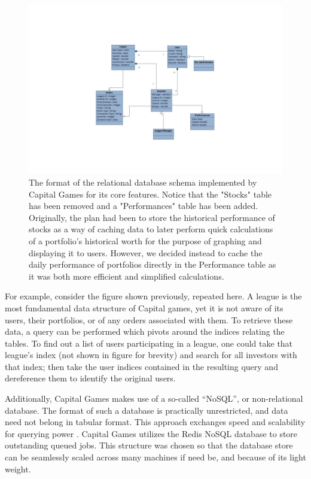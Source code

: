 \begin{figure}[ht]
\centering
\includegraphics[width=6in]{./img/domainModel.pdf}
\caption{The format of the relational database
schema implemented by Capital Games for its core features.
Notice that the "Stocks" table has been removed and a "Performances" table has been added. Originally, the plan had been to store the historical performance of stocks as a way of caching data to later perform quick calculations of a portfolio's historical worth for the purpose of graphing and displaying it to users. However, we decided instead to cache the daily performance of portfolios directly in the Performance table as it was both more efficient and simplified calculations.}
\end{figure}

For example, consider the figure shown previously, repeated here.
A league is the most fundamental data structure of Capital games,
yet it is not aware of its users, their portfolios, or of any
orders associated with them. To retrieve these data, a query can
be performed which pivots around the indices relating the tables.
To find out a list of users participating in a league, one could
take that league's index (not shown in figure for brevity) and
search for all investors with that index; then take the user
indices contained in the resulting query and dereference them
to identify the original users. 

Additionally, Capital Games makes use of a so-called ``NoSQL'',
or non-relational database. The format of such a database is
practically unrestricted, and data need not belong in tabular
format. This approach exchanges speed and scalability for
querying power \cite{wiki:nosql}. Capital Games utilizes the
Redis NoSQL database to store outstanding queued jobs. This
structure was chosen so that the database store can be
seamlessly scaled across many machines if need be, and
because of its light weight. 